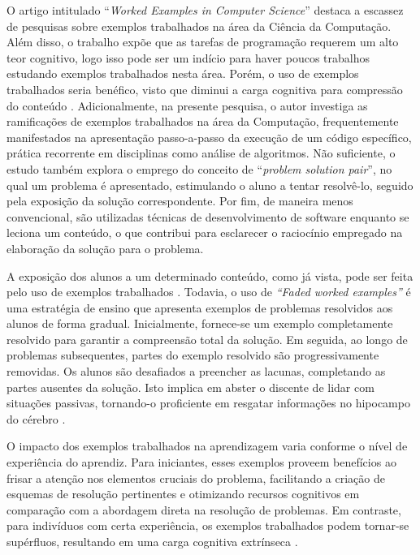 O artigo intitulado ``\textit{Worked Examples in Computer Science}'' \cite{Skudder-LuxtonReilly:2014} destaca a escassez de pesquisas sobre exemplos trabalhados na área da Ciência da Computação. Além disso, o trabalho expõe que as tarefas de programação requerem um alto teor cognitivo, logo isso pode ser um indício para haver poucos trabalhos estudando exemplos trabalhados nesta área. Porém, o uso de exemplos trabalhados seria benéfico, visto que diminui a carga cognitiva para compressão do conteúdo \cite{Robert.Atkinson-etal:2000}. Adicionalmente, na presente pesquisa, o autor investiga as ramificações de exemplos trabalhados na área da Computação, frequentemente manifestados na apresentação passo-a-passo da execução de um código específico, prática recorrente em disciplinas como análise de algoritmos. Não suficiente, o estudo também explora o emprego do conceito de ``\textit{problem solution pair}'', no qual um problema é apresentado, estimulando o aluno a tentar resolvê-lo, seguido pela exposição da solução correspondente. Por fim, de maneira menos convencional, são utilizadas técnicas de desenvolvimento de software enquanto se leciona um conteúdo, o que contribui para esclarecer o raciocínio empregado na elaboração da solução para o problema.

A exposição dos alunos a um determinado conteúdo, como já vista, pode ser feita pelo uso de exemplos trabalhados \cite{Robert.Atkinson-etal:2000}. Todavia, o uso de \textit{``Faded worked examples''} é uma estratégia de ensino que apresenta exemplos de problemas resolvidos aos alunos de forma gradual. Inicialmente, fornece-se um exemplo completamente resolvido para garantir a compreensão total da solução. Em seguida, ao longo de problemas subsequentes, partes do exemplo resolvido são progressivamente removidas. Os alunos são desafiados a preencher as lacunas, completando as partes ausentes da solução. Isto implica em abster o discente de lidar com situações passivas, tornando-o proficiente em resgatar informações no hipocampo do cérebro \cite{Skudder-LuxtonReilly:2014}.

O impacto dos exemplos trabalhados na aprendizagem varia conforme o nível de experiência do aprendiz. Para iniciantes, esses exemplos proveem benefícios ao frisar a atenção nos elementos cruciais do problema, facilitando a criação de esquemas de resolução pertinentes e otimizando recursos cognitivos em comparação com a abordagem direta na resolução de problemas. Em contraste, para indivíduos com certa experiência, os exemplos trabalhados podem tornar-se supérfluos, resultando em uma carga cognitiva extrínseca \cite{Skudder-LuxtonReilly:2014}.

